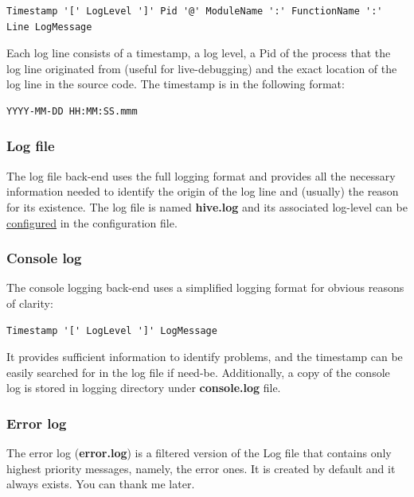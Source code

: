\documentclass[a4paper]{article}
\begin{document}
\begin{verbatim}
Timestamp '[' LogLevel ']' Pid '@' ModuleName ':' FunctionName ':' Line LogMessage
\end{verbatim}




\noindent
Each log line consists of a timestamp, a log level, a Pid of the process that the log line originated from (useful for live-debugging) and the exact location of the log line in the source code. The timestamp is in the following format:


\begin{verbatim}
YYYY-MM-DD HH:MM:SS.mmm
\end{verbatim}
\subsubsection{Log file}
\label{sec-5-1-1}

The log file back-end uses the full logging format and provides all the necessary information needed to identify the origin of the log line and (usually) the reason for its existence. The log file is named \textbf{hive.log} and its associated log-level can be \hyperref[sec-3-1-8]{configured} in the configuration file.
\subsubsection{Console log}
\label{sec-5-1-2}

The console logging back-end uses a simplified logging format for obvious reasons of clarity:


\begin{verbatim}
Timestamp '[' LogLevel ']' LogMessage
\end{verbatim}




\noindent
It provides sufficient information to identify problems, and the timestamp can be easily searched for in the log file if need-be.
Additionally, a copy of the console log is stored in logging directory under \textbf{console.log} file.
\subsubsection{Error log}
\label{sec-5-1-3}

The error log (\textbf{error.log}) is a filtered version of the Log file that contains only highest priority messages, namely, the error ones. It is created by default and it always exists. You can thank me later.
\end{document}
